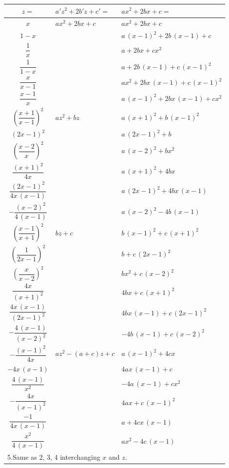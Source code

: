 \documentclass[12pt,a4paper,oneside]{book}
\theoremstyle{plain}
\theoremstyle{definition}
\theoremstyle{remark}
\begin{document}
\begin{center}
\small
\begin{tabular}{|c|l|l|}
\hline
$z=$ & $a'z^2+2b'z+c'=$ & $ax^2+2bx+c=$\\
\hline
$x$ & $ax^2+2bx+c$ & $ax^2+2bx+c$\\
$1-x$ & \quad\phantom{''} & $a\,(x-1)^2+2b\,(x-1)+c$\\
$\dfrac{1}{x}$ & \quad\phantom{''} & $a+2bx+cx^2$\\
$\dfrac{1}{1-x}$ & \quad\phantom{''} & $a+2b\,(x-1)+c\,(x-1)^2$\\
$\dfrac{x}{x-1}$ & \quad\phantom{''} & $ax^2+2bx\,(x-1)+c\,(x-1)^2$\\
$\dfrac{x-1}{x}$ & \quad\phantom{''} & $a\,(x-1)^2+2bx\,(x-1)+cx^2$\\
\hline
$\left(\dfrac{x+1}{x-1}\right)^2$ & $az^2+bz$ & $a\,(x+1)^2+b\,(x-1)^2$\\
$(2x-1)^2$ & \quad\phantom{''} & $a\,(2x-1)^2+b$\\
$\left(\dfrac{x-2}{x}\right)^2$ & \quad\phantom{''} & $a\,(x-2)^2+bx^2$\\
$\dfrac{(x+1)^2}{4x}$ & \quad\phantom{''} & $a\,(x+1)^2+4bx$\\
$\dfrac{(2x-1)^2}{4x\,(x-1)}$ & \quad\phantom{''} & $a\,(2x-1)^2+4bx\,(x-1)$\\
$-\dfrac{(x-2)^2}{4\,(x-1)}$ & \quad\phantom{''} & $a\,(x-2)^2-4b\,(x-1)$\\
\hline
$\left(\dfrac{x-1}{x+1}\right)^2$ & $bz+c$ & $b\,(x-1)^2+c\,(x+1)^2$\\
$\left(\dfrac{1}{2x-1}\right)^2$ & \quad\phantom{''} & $b+c\,(2x-1)^2$\\
$\left(\dfrac{x}{x-2}\right)^2$ & \quad\phantom{''} & $bx^2+c\,(x-2)^2$\\
$\dfrac{4x}{(x+1)^2}$ & \quad\phantom{''} & $4bx+c\,(x+1)^2$\\
$\dfrac{4x\,(x-1)}{(2x-1)^2}$ & \quad\phantom{''} & $4bx\,(x-1)+c\,(2x-1)^2$\\
$-\dfrac{4\,(x-1)}{(x-2)^2}$ & \quad\phantom{''} & $-4b\,(x-1)+c\,(x-2)^2$\\
\hline
$-\dfrac{(x-1)^2}{4x}$ & $az^2-(a+c)z+c$ & $a\,(x-1)^2+4cx$\\
$-4x\,(x-1)$ & \quad\phantom{''} & $4ax\,(x-1)+c$\\
$\dfrac{4\,(x-1)}{x^2}$ & \quad\phantom{''} & $-4a\,(x-1)+cx^2$\\
$-\dfrac{4x}{(x-1)^2}$ & \quad\phantom{''} & $4ax+c\,(x-1)^2$\\
$\dfrac{-1}{4x\,(x-1)}$ & \quad\phantom{''} & $a+4cx\,(x-1)$\\
$\dfrac{x^2}{4\,(x-1)}$ & \quad\phantom{''} & $ax^2-4c\,(x-1)$\\
\hline
\multicolumn{3}{|l|}{5.\hspace{2em}Same as 2, 3, 4 interchanging $x$ and $z$.}\\
\hline
\end{tabular}
\end{center}
\end{document}
